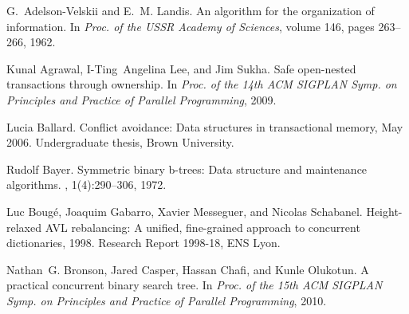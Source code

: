 \begin{thebibliography}{99}
{
G.~Adelson-Velskii and E.~M. Landis.
\newblock An algorithm for the organization of information.
\newblock In {\em Proc. of the USSR Academy of Sciences}, volume 146, pages
  263--266, 1962.

Kunal Agrawal, I-Ting~Angelina Lee, and Jim Sukha.
\newblock Safe open-nested transactions through ownership.
\newblock In {\em Proc. of the 14th ACM SIGPLAN Symp. on Principles and
  Practice of Parallel Programming}, 2009.






Lucia Ballard.
\newblock Conflict avoidance: Data structures in transactional memory, May
  2006.
\newblock Undergraduate thesis, Brown University.



Rudolf Bayer.
\newblock Symmetric binary b-trees: Data structure and maintenance algorithms.
, 1(4):290--306, 1972.

Luc Boug\'e, Joaquim Gabarro, Xavier Messeguer, and Nicolas Schabanel.
\newblock Height-relaxed {AVL} rebalancing: A unified, fine-grained approach to
  concurrent dictionaries, 1998.
\newblock Research Report 1998-18, ENS Lyon.


Nathan~G. Bronson, Jared Casper, Hassan Chafi, and Kunle Olukotun.
\newblock A practical concurrent binary search tree.
\newblock In {\em Proc. of the 15th ACM SIGPLAN Symp. on Principles and
  Practice of Parallel Programming}, 2010.


}
\end{thebibliography}

